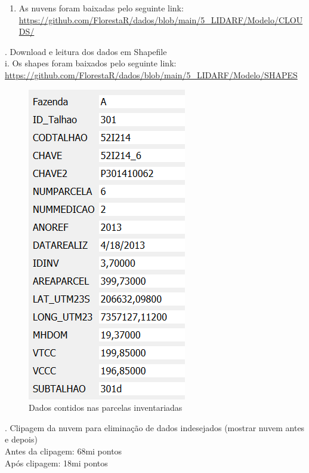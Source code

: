 \documentclass[
]{article}
\providecommand{\tightlist}{%
  \setlength{\itemsep}{0pt}\setlength{\parskip}{0pt}}
\begin{document}
\begin{enumerate}
\def\labelenumi{\roman{enumi}.}
\setcounter{enumi}{1}
\tightlist
\item
  As nuvens foram baixadas pelo seguinte link:
  \url{https://github.com/FlorestaR/dados/blob/main/5_LIDARF/Modelo/CLOUDS/}
\end{enumerate}


. Download e leitura dos dados em Shapefile\\
i. Os shapes foram baixados pelo seguinte link:
\url{https://github.com/FlorestaR/dados/blob/main/5_LIDARF/Modelo/SHAPES}

\begin{figure}

{\centering \includegraphics[width=0.5\linewidth]{IMAGES/atributosinventariadas} 

}

\caption{Dados contidos nas parcelas inventariadas}\label{fig:unnamed-chunk-9}
\end{figure}


. Clipagem da nuvem para eliminação de dados indesejados (mostrar nuvem
antes e depois)\\
Antes da clipagem: 68mi pontos\\
Após clipagem: 18mi pontos
\end{document}
